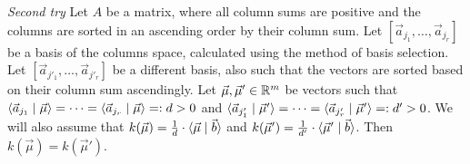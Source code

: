 \begin{lemma}
    \textit{Second try}
    Let $A$ be a matrix, where all column sums are positive and the columns are sorted in an ascending order by their column sum. Let $[\vec a_{j_1}, \dots, \vec a_{j_r}]$ be a basis of the columns space, calculated using the method of basis selection. Let $[\vec a_{j'_1}, \dots, \vec a_{j'_r}]$ be a different basis, also such that the vectors are sorted based on their column sum ascendingly. Let $\vec\mu, \vec\mu' \in \mathbb{R}^m$ be vectors such that $\langle \vec a_{j_1} \mid \vec\mu \rangle = \dots = \langle \vec a_{j_r} \mid \vec\mu \rangle =: d > 0$ and $\langle \vec a_{j'_1} \mid \vec\mu' \rangle = \dots = \langle \vec a_{j'_r} \mid \vec\mu' \rangle =: d' > 0$. We will also assume that $k(\vec \mu) = \frac{1}{d}\cdot\langle \vec{\mu} \mid \vec b \rangle$ and $k(\vec \mu') = \frac{1}{d'}\cdot\langle \vec{\mu}' \mid \vec b \rangle$. Then $k(\vec\mu) = k(\vec\mu')$.
\end{lemma}

